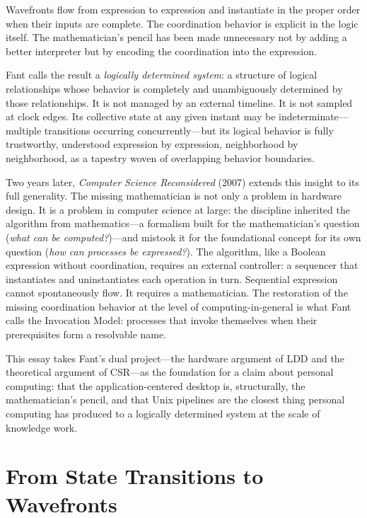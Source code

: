 \documentclass[12pt, a4paper]{article}
\begin{document}
Wavefronts flow from expression to expression and instantiate in the
proper order when their inputs are complete. The coordination behavior
is explicit in the logic itself. The mathematician's pencil has been
made unnecessary not by adding a better interpreter but by encoding
the coordination into the expression.

Fant calls the result a \emph{logically determined system}: a structure
of logical relationships whose behavior is completely and unambiguously
determined by those relationships. It is not managed by an external
timeline. It is not sampled at clock edges. Its collective state at any
given instant may be indeterminate---multiple transitions occurring
concurrently---but its logical behavior is fully trustworthy, understood
expression by expression, neighborhood by neighborhood, as a tapestry
woven of overlapping behavior boundaries.

Two years later, \textit{Computer Science Reconsidered} (2007) extends
this insight to its full generality. The missing mathematician is not
only a problem in hardware design. It is a problem in computer science
at large: the discipline inherited the algorithm from mathematics---a
formalism built for the mathematician's question (\emph{what can be
computed?})---and mistook it for the foundational concept for its own
question (\emph{how can processes be expressed?}). The algorithm, like
a Boolean expression without coordination, requires an external
controller: a sequencer that instantiates and uninstantiates each
operation in turn. Sequential expression cannot spontaneously flow.
It requires a mathematician. The restoration of the missing coordination
behavior at the level of computing-in-general is what Fant calls the
Invocation Model: processes that invoke themselves when their
prerequisites form a resolvable name.

This essay takes Fant's dual project---the hardware argument of LDD
and the theoretical argument of CSR---as the foundation for a claim
about personal computing: that the application-centered desktop is,
structurally, the mathematician's pencil, and that Unix pipelines are
the closest thing personal computing has produced to a logically
determined system at the scale of knowledge work.

\section{From State Transitions to Wavefronts}
\end{document}
